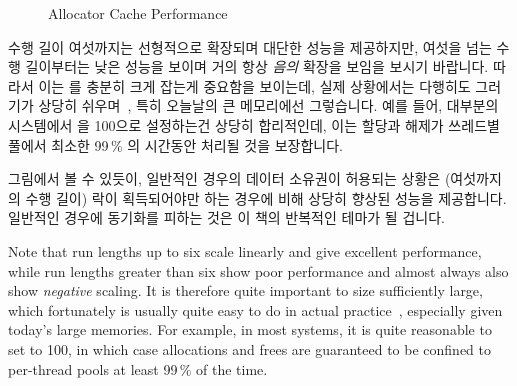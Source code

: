\begin{figure}[tbp]
\centering
{}
\caption{Allocator Cache Performance}
\label{fig:SMPdesign:Allocator Cache Performance}
\end{figure}

수행 길이 여섯까지는 선형적으로 확장되며 대단한 성능을 제공하지만, 여섯을 넘는
수행 길이부터는 낮은 성능을 보이며 거의 항상 \emph{음의} 확장을 보임을 보시기
바랍니다.
따라서 이는  를 충분히 크게 잡는게 중요함을 보이는데, 실제
상황에서는 다행히도 그러기가 상당히 쉬우며~\cite{McKenney01e}, 특히 오늘날의 큰
메모리에선 그렇습니다.
예를 들어, 대부분의 시스템에서  을 100으로 설정하는건
상당히 합리적인데, 이는 할당과 해제가 쓰레드별 풀에서 최소한 99\,\% 의 시간동안
처리될 것을 보장합니다.

그림에서 볼 수 있듯이, 일반적인 경우의 데이터 소유권이 허용되는 상황은
(여섯까지의 수행 길이) 락이 획득되어야만 하는 경우에 비해 상당히 향상된 성능을
제공합니다.
일반적인 경우에 동기화를 피하는 것은 이 책의 반복적인 테마가 될 겁니다.

\iffalse

Note that run lengths up to six scale linearly and give excellent performance,
while run lengths greater than six show poor performance and almost always
also show \emph{negative} scaling.
It is therefore quite important to size 
sufficiently large,
which fortunately is usually quite easy to do in actual
practice~\cite{McKenney01e}, especially given today's large memories.
For example, in most systems, it is quite reasonable to set
 to 100, in which case allocations and frees
are guaranteed to be confined to per-thread pools at least 99\,\% of
the time.


